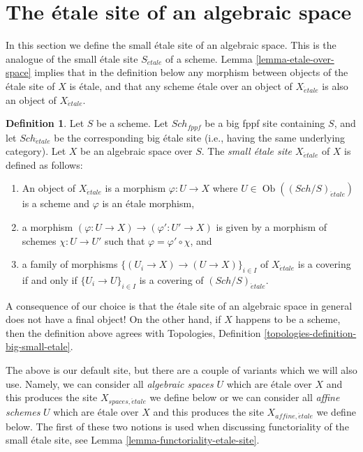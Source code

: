 \documentclass{stacks-project}
\theoremstyle{plain}
\theoremstyle{definition}
\newtheorem{definition}[subsection]{Definition}
\theoremstyle{remark}
\numberwithin{equation}{subsection}
\def\Sch{\mathit{Sch}}
\def\Ob{\mathop{\mathrm{Ob}}\nolimits}
\def\etale{{\acute{e}tale}}
\begin{document}
\section{The \'etale site of an algebraic space}
\label{section-etale-site}

\noindent
In this section we define the small \'etale site of an algebraic space.
This is the analogue of the small \'etale site $S_\etale$ of a scheme.
Lemma \ref{lemma-etale-over-space} implies that in the definition below
any morphism between objects of the \'etale site of $X$ is \'etale, and that
any scheme \'etale over an object of $X_\etale$ is also an object of
$X_\etale$.

\begin{definition}
\label{definition-etale-site}
Let $S$ be a scheme.
Let $\Sch_{fppf}$ be a big fppf site containing $S$,
and let $\Sch_\etale$ be the corresponding big \'etale site
(i.e., having the same underlying category).
Let $X$ be an algebraic space over $S$.
The {\it small \'etale site $X_\etale$} of $X$ is defined as follows:
\begin{enumerate}
\item An object of $X_\etale$ is a morphism $\varphi : U \to X$
where $U \in \Ob((\Sch/S)_\etale)$ is a scheme and
$\varphi$ is an \'etale morphism,
\item a morphism $(\varphi : U \to X) \to (\varphi' : U' \to X)$
is given by a morphism of schemes $\chi : U \to U'$ such that
$\varphi = \varphi' \circ \chi$, and
\item a family of morphisms $\{(U_i \to X) \to (U \to X)\}_{i \in I}$
of $X_\etale$ is a covering if and only if $\{U_i \to U\}_{i \in I}$
is a covering of $(\Sch/S)_\etale$.
\end{enumerate}
\end{definition}

\noindent
A consequence of our choice is that the \'etale site of an algebraic space
in general does not have a final object! On the other hand, if $X$ happens
to be a scheme, then the definition above agrees with
Topologies, Definition \ref{topologies-definition-big-small-etale}.

\medskip\noindent
The above is our default site, but there are a couple of variants
which we will also use. Namely, we can consider all {\it algebraic spaces}
$U$ which are \'etale over $X$ and this produces the site
$X_{spaces, \etale}$ we define below or we can consider all {\it affine schemes}
$U$ which are \'etale over $X$ and this produces the site
$X_{affine, \etale}$ we define below. The first of these two notions
is used when discussing functoriality of the small \'etale site, see
Lemma \ref{lemma-functoriality-etale-site}.
\end{document}
